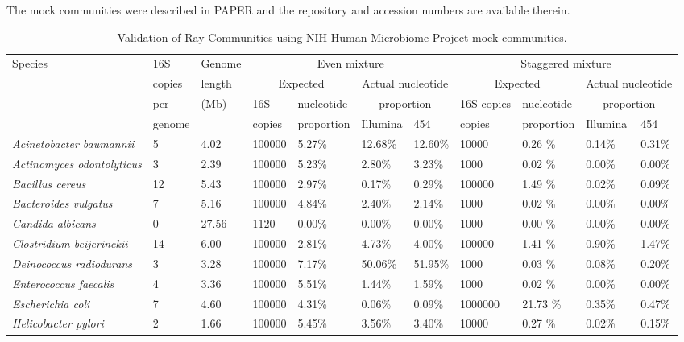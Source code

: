 \documentclass{article}
\begin{document}
\begin{landscape}
\begin{table}
\caption{Validation of Ray Communities using NIH Human Microbiome Project mock communities.}
The mock communities were described in PAPER and the repository and accession numbers are available therein.\\
\label{TableMocks}
\begin{tabular}{lllllllllll}
\hline
Species & 16S& Genome &  \multicolumn{4}{c}{Even mixture} &  \multicolumn{4}{c}{Staggered mixture} \\
 &copies & length & \multicolumn{2}{c}{Expected} & \multicolumn{2}{c}{Actual nucleotide} & \multicolumn{2}{c}{Expected} & \multicolumn{2}{c}{Actual nucleotide}  \\
       & per & (Mb) & 16S & nucleotide & \multicolumn{2}{c}{proportion} & 16S copies & nucleotide & \multicolumn{2}{c}{proportion}   \\
 & genome &  & copies & proportion & Illumina& 454 & copies & proportion & Illumina & 454 \\
\hline
\textit{Acinetobacter baumannii} & 5 & 4.02  & 100000 & 5.27\% & 12.68\% &  12.60\% & 10000 & 0.26 \%   & 0.14\%  & 0.31\% \\
\textit{Actinomyces odontolyticus} & 3 & 2.39  & 100000 & 5.23\% & 2.80\% &  3.23\% & 1000 & 0.02 \%   & 0.00\%  & 0.00\% \\
\textit{Bacillus cereus} & 12 & 5.43  & 100000 & 2.97\% & 0.17\% &  0.29\% & 100000 & 1.49 \%   & 0.02\%  & 0.09\% \\
\textit{Bacteroides vulgatus} & 7 & 5.16  & 100000 & 4.84\% & 2.40\% &  2.14\% & 1000 & 0.02 \%   & 0.00\%  & 0.00\% \\
\textit{Candida albicans} & 0 & 27.56  & 1120 & 0.00\% & 0.00\% &  0.00\% & 1000 & 0.00 \%   & 0.00\%  & 0.00\% \\
\textit{Clostridium beijerinckii} & 14 & 6.00  & 100000 & 2.81\% & 4.73\% &  4.00\% & 100000 & 1.41 \%   & 0.90\%  & 1.47\% \\
\textit{Deinococcus radiodurans} & 3 & 3.28  & 100000 & 7.17\% & 50.06\% &  51.95\% & 1000 & 0.03 \%   & 0.08\%  & 0.20\% \\
\textit{Enterococcus faecalis} & 4 & 3.36  & 100000 & 5.51\% & 1.44\% &  1.59\% & 1000 & 0.02 \%   & 0.00\%  & 0.00\% \\
\textit{Escherichia coli} & 7 & 4.60  & 100000 & 4.31\% & 0.06\% &  0.09\% & 1000000 & 21.73 \%   & 0.35\%  & 0.47\% \\
\textit{Helicobacter pylori} & 2 & 1.66  & 100000 & 5.45\% & 3.56\% &  3.40\% & 10000 & 0.27 \%   & 0.02\%  & 0.15\% \\

\end{tabular}
\end{table}
\end{landscape}
\end{document}
